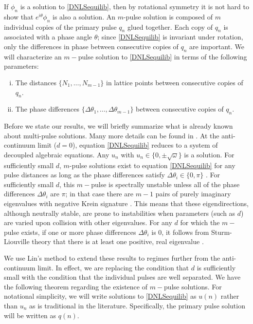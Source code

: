 \documentclass[thesis.tex]{subfiles}
\begin{document}
If $\phi_n$ is a solution to \cref{DNLSequilib}, then by rotational symmetry it is not hard to show that $e^{i \theta} \phi_n$ is also a solution. An $m$-pulse solution is composed of $m$ individual copies of the primary pulse $q_n$ glued together. Each copy of $q_n$ is associated with a phase angle $\theta$; since \cref{DNLSequilib} is invariant under rotation, only the differences in phase between consecutive copies of $q_n$ are important. We will characterize an $m-$pulse solution to \cref{DNLSequilib} in terms of the following parameters: 
\begin{enumerate}[(i)]
\item The distances $\{ N_1, \dots, N_{m-1} \}$ in lattice points between consecutive copies of $q_n$.
\item The phase differences $\{ \Delta\theta_1, \dots, \Delta\theta_{m-1} \}$ between consecutive copies of $q_n$.
\end{enumerate}

Before we state our results, we will briefly summarize what is already known about multi-pulse solutions. Many more details can be found in \cite{Kevrekidis2009,pelinovsky_2011}. At the anti-continuum limit ($d = 0$), equation \cref{DNLSequilib} reduces to a system of decoupled algebraic equations. Any $u_n$ with $u_n \in \{ 0, \pm \sqrt{\omega}\}$ is a solution. For sufficiently small $d$, $m$-pulse solutions exist to equation \cref{DNLSequilib} for any pulse distances as long as the phase differences satisfy $\Delta \theta_i \in \{0, \pi\}$ \cite[Proposition 2.1]{Pelinovsky2005}. For sufficiently small $d$, this $m-$pulse is spectrally unstable unless all of the phase differences $\Delta \theta_i$ are $\pi$; in that case there are $m-1$ pairs of purely imaginary eigenvalues with negative Krein signature \cite[Theorem 3.6]{Pelinovsky2005}. This means that these eigendirections, although neutrally stable, are prone to instabilities when parameters (such as $d$) are varied upon collision with other eigenvalues. For any $d$ for which the $m-$pulse exists, if one or more phase differences $\Delta \theta_i$ is 0, it follows from Sturm-Liouville theory that there is at least one positive, real eigenvalue \cite{Kapitula2001a}.

We use Lin's method to extend these results to regimes further from the anti-continuum limit. In effect, we are replacing the condition that $d$ is sufficiently small with the condition that the individual pulses are well separated. We have the following theorem regarding the existence of $m-$pulse solutions. For notational simplicity, we will write solutions to \cref{DNLSequilib} as $u(n)$ rather than $u_n$ as is traditional in the literature. Specifically, the primary pulse solution will be written as $q(n)$.
\end{document}

